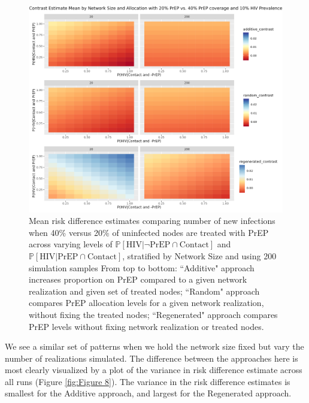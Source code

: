 \documentclass{article}
\theoremstyle{definition}
\begin{document}
\begin{figure}[H]
    \centering
    \includegraphics[width=\linewidth]{Corrected Figures/Network Size Mean Plot.png}
    \caption{Mean risk difference estimates comparing number of new infections when 40\% versus 20\% of uninfected nodes are treated with PrEP across varying levels of $\mathbb{P}\left[\text{HIV} \vert \neg \text{PrEP} \cap \text{Contact}\right]$ and $\mathbb{P}\left[\text{HIV} \vert \text{PrEP} \cap \text{Contact}\right]$, stratified by Network Size and using 200 simulation samples 
    From top to bottom: ``Additive" approach increases proportion on PrEP compared to a given network realization and given set of treated nodes; ``Random" approach compares PrEP allocation levels for a given network realization, without fixing the treated nodes; ``Regenerated" approach compares PrEP levels without fixing network realization or treated nodes. }
    \label{fig:Figure 7}
\end{figure}

We see a similar set of patterns when we hold the network size fixed but vary the number of realizations simulated. The difference between the approaches here is most clearly visualized by a plot of the variance in risk difference estimate across all runs (Figure \ref{fig:Figure 8}). The variance in the risk difference estimates is smallest for the Additive approach, and largest for the Regenerated approach. 
\end{document}
